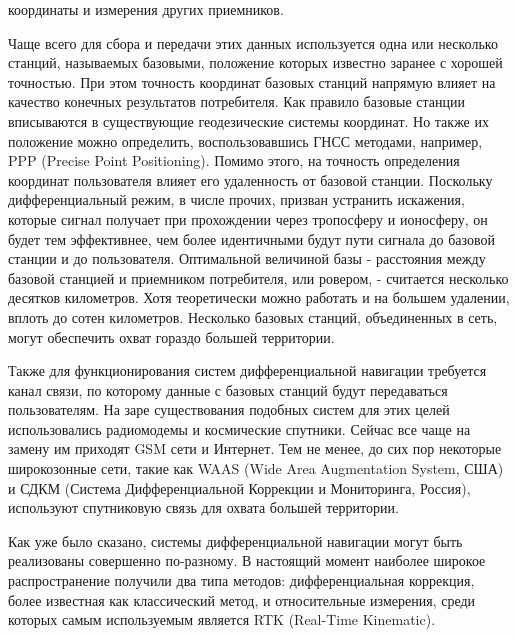 \documentclass[a4paper,12pt]{report}
\begin{document}
координаты и измерения других приемников. \par
Чаще всего для сбора и передачи этих данных используется одна или несколько станций, называемых 
базовыми, положение которых известно заранее с хорошей точностью. При этом точность координат базовых станций напрямую влияет на качество 
конечных результатов потребителя. Как правило базовые станции вписываются в существующие геодезические системы координат. Но также их 
положение можно определить, воспользовавшись ГНСС методами, например, PPP (Precise Point Positioning). Помимо этого, на точность определения 
координат пользователя влияет его удаленность от базовой станции. Поскольку дифференциальный режим, в числе прочих, призван устранить 
искажения, которые сигнал получает при прохождении через тропосферу и ионосферу, он будет тем эффективнее, чем более идентичными будут пути 
сигнала до базовой станции и до пользователя. Оптимальной величиной базы - расстояния между базовой станцией и приемником потребителя, или 
ровером, - считается несколько десятков километров. Хотя теоретически можно работать и на большем удалении, вплоть до сотен километров. 
Несколько базовых станций, объединенных в сеть, могут обеспечить охват гораздо большей территории. \par
Также для функционирования систем 
дифференциальной навигации требуется канал связи, по которому данные с базовых станций будут передаваться пользователям. На заре существования 
подобных систем для этих целей использовались радиомодемы и космические спутники. Сейчас все чаще на замену им приходят GSM сети и Интернет. 
Тем не менее, до сих пор некоторые широкозонные сети, такие как WAAS (Wide Area Augmentation System, США) и СДКМ (Система Дифференциальной 
Коррекции и Мониторинга, Россия), используют спутниковую связь для охвата большей территории. \par
Как уже было сказано, системы дифференциальной навигации могут быть реализованы совершенно по-разному. В настоящий момент наиболее широкое 
распространение получили два типа методов: дифференциальная коррекция, более известная как классический метод, и относительные измерения, 
среди которых самым используемым является RTK (Real-Time Kinematic).
\end{document}
